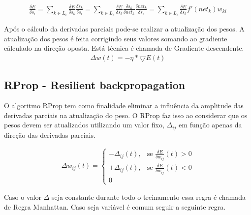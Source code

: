 \documentclass[
	article,			%
	11pt,				%
	oneside,			%
	a4paper,			%
	english,			%
	brazil,				%
	sumario=tradicional
	]{abntex2}
\begin{document}
\begin{align}
\frac{\delta E}{\delta s_i}=
\sum_{k \in L_i} \frac{\delta E}{\delta s_k} \frac{\delta s_k}{\delta s_i}=
\sum_{k \in L_i} \frac{\delta E}{\delta s_k} \frac{\delta s_k}{\delta net_k}
\frac{\delta net_k}{\delta s_i}=
\sum_{k \in L_i} \frac{\delta E}{\delta s_k} f'(net_k)w_{ki}
\end{align}

Após o cálculo da derivadas parciais pode-se realizar a atualização dos pesos. A
atualização dos pesos é feita corrigindo seus valores somando ao gradiente
cálculado na direção oposta. Está técnica é chamada de Gradiente descendente.
\begin{align}
\Delta w(t)=-\eta * \bigtriangledown E(t)
\end{align}

\subsection{RProp - Resilient backpropagation}
O algoritmo RProp tem como finalidade eliminar a influência da amplitude das
derivadas parciais na atualização do peso. O RProp faz isso ao considerar que os
pesos devem ser atualizados utilizando um valor fixo, $\Delta_{ij}$ em função
apenas da direção das derivadas parciais.

\begin{align}
\Delta w_{ij}(t) = 
\begin{cases} 
		-\Delta_{ij}(t), & \mbox{se } \frac{\delta E}{\delta w_{ij}}(t)>0 \\ 
		+\Delta_{ij}(t), & \mbox{se } \frac{\delta E}{\delta w_{ij}}(t)<0 \\
		0
\end{cases}
\end{align}

Caso o valor $\Delta$ seja constante durante todo o treinamento essa regra é
chamada de Regra Manhattan.
Caso seja variável é comum seguir a seguinte regra.
\end{document}
